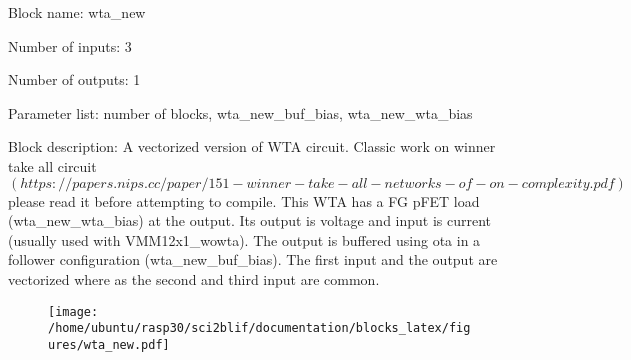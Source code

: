 \pagebreak
Block name: wta\_new

Number of inputs: 3

Number of outputs: 1

Parameter list: number of blocks, wta\_new\_buf\_bias, wta\_new\_wta\_bias

Block description: 
A vectorized version of WTA circuit. Classic work on winner take all circuit $(https://papers.nips.cc/paper/151-winner-take-all-networks-of-on-complexity.pdf)$ please read it before attempting to compile. 
This WTA has a FG pFET load (wta\_new\_wta\_bias) at the output. Its output is voltage and input is current (usually used with VMM12x1\_wowta).
The output is buffered using ota in a follower configuration (wta\_new\_buf\_bias). The first input and the output are vectorized where as the second and third input are common.



\begin{figure}[H]  %
\texttt{[image: /home/ubuntu/rasp30/sci2blif/documentation/blocks\_latex/figures/wta\_new.pdf]}
\end{figure}

